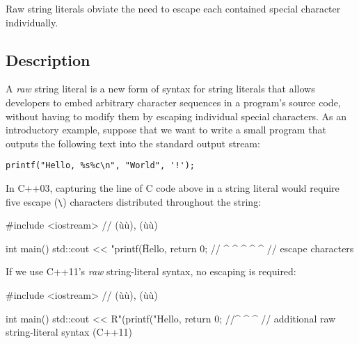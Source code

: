 
\setcounter{table}{0}
\setcounter{footnote}{0}
\setcounter{lstlisting}{0}

Raw string literals obviate the need to escape each contained special
character individually.

\subsection[Description]{Description}\label{description}

A \emph{raw} string literal is a new form of syntax for string literals
that allows developers to embed arbitrary character sequences in a
program's source code, without having to modify them by escaping
individual special characters. As an introductory example, suppose that
we want to write a small program that outputs the following text into the standard output stream:

\begin{lstlisting}[style=plain]
printf("Hello, %s%c\n", "World", '!');
\end{lstlisting}
    
\noindent In C++03, capturing the line of C code above in a string literal would
require five escape (\lstinline!\!) characters distributed
throughout the string:

\begin{emcppslisting}
#include <iostream>  // (ù{}ù), (ù{}ù)

int main()
{
    std::cout << "printf(\"Hello, %
    return 0;  //        ^            ^  ^   ^      ^
               //             escape characters
}
\end{emcppslisting}
    
\noindent If we use C++11's \emph{raw} string-literal syntax, no escaping is
required:

\begin{emcppslisting}
#include <iostream>  // (ù{}ù), (ù{}ù)

int main()
{
    std::cout << R"(printf("Hello, %
    return 0;  //^ ^                                      ^
               //   additional raw string-literal syntax (C++11)
}
\end{emcppslisting}
    
